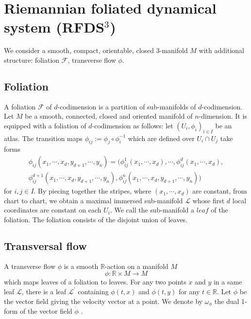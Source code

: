 \section{Riemannian foliated dynamical system (RFDS\texorpdfstring{$^{3}$}{3})}

We consider a smooth, compact, orientable, closed 3-manifold $M$ with additional structure: foliation $\mathcal{F}$, transverse flow $\phi$. 

    \subsection{Foliation}
    A foliation $\mathcal{F}$ of $d$-codimension is a partition of sub-manifolds of $d$-codimension.
    Let $M$ be a smooth, connected, closed and oriented manifold of $n$-dimension. It is equipped with a foliation of $d$-codimension as follows: let $(U_{i}, \phi_{i})_{i\in{I}}$ be an atlas.
    The transition maps $\phi_{ij}:=\phi_{j}\circ\phi_{i}^{-1}$ which are defined over $U_{i}\cap{U_{j}}$ take forms 
    \begin{multline*}
        \phi_{ij}(x_{1},\cdots,x_{d},y_{d+1},\cdots,y_{n}) = (\phi_{ij}^{1}(x_{1},\cdots,x_{d}),\cdots,\phi_{ij}^{d}(x_{1},\cdots,x_{d}), \\
        \phi_{ij}^{d+1}(x_{1},\cdots,x_{d},y_{d+1},\cdots,y_{n}), \phi_{ij}^{n}(x_{1},\cdots,x_{d},y_{d+1},\cdots,y_{n}))
    \end{multline*}
    for $i,j \in {I}$.
    By piecing together the stripes, where $(x_{1}, \cdots, x_{d})$ are constant, from chart to chart, we obtain a maximal immersed sub-manifold $\mathcal{L}$ whose first $d$ local coordinates are constant on each $U_{i}$.
    We call the sub-manifold a $\textit{leaf}$ of the foliation.
    The foliation consists of the disjoint union of leaves.
    
    \subsection{Transversal flow}
    A transverse flow $\phi$ is a smooth $\mathbb{R}$-action on a manifold $M$
    \begin{equation*}
        \phi : \mathbb{R} \times {M} \rightarrow {M}
    \end{equation*}
    which maps leaves of a foliation to leaves. 
    For any two points $x$ and $y$ in a same leaf $\mathcal{L}$, there is a leaf $\mathcal{L}^{'}$ containing $\phi(t,x)$ and $\phi(t, y)$ for any $t\in\mathbb{R}$.
    Let $\dot{\phi}$ be the vector field giving the velocity vector at a point.
    We denote by $\omega_{\phi}$ the dual 1-form of the vector field $\dot{\phi}$ .
    
